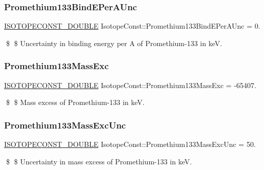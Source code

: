 \subsubsection{\texorpdfstring{Promethium133\+Bind\+E\+Per\+A\+Unc}{Promethium133BindEPerAUnc}}
{\footnotesize\ttfamily \mbox{\hyperlink{group___isotope_const-_macros_ga8f45a7272ce02c0b4c65c44636ed719a}{I\+S\+O\+T\+O\+P\+E\+C\+O\+N\+S\+T\+\_\+\+D\+O\+U\+B\+LE}} Isotope\+Const\+::\+Promethium133\+Bind\+E\+Per\+A\+Unc = 0.}

\$ \$ Uncertainty in binding energy per A of Promethium-\/133 in keV. \mbox{\label{group___isotope_const-_promethium-_pm133_gae45da4b5dc218983ab1d4be84ca98029}} 
\subsubsection{\texorpdfstring{Promethium133\+Mass\+Exc}{Promethium133MassExc}}
{\footnotesize\ttfamily \mbox{\hyperlink{group___isotope_const-_macros_ga8f45a7272ce02c0b4c65c44636ed719a}{I\+S\+O\+T\+O\+P\+E\+C\+O\+N\+S\+T\+\_\+\+D\+O\+U\+B\+LE}} Isotope\+Const\+::\+Promethium133\+Mass\+Exc = -\/65407.}

\$ \$ Mass excess of Promethium-\/133 in keV. \mbox{\label{group___isotope_const-_promethium-_pm133_ga2dcb9eadf4ba74a02163d82fae075a34}} 
\subsubsection{\texorpdfstring{Promethium133\+Mass\+Exc\+Unc}{Promethium133MassExcUnc}}
{\footnotesize\ttfamily \mbox{\hyperlink{group___isotope_const-_macros_ga8f45a7272ce02c0b4c65c44636ed719a}{I\+S\+O\+T\+O\+P\+E\+C\+O\+N\+S\+T\+\_\+\+D\+O\+U\+B\+LE}} Isotope\+Const\+::\+Promethium133\+Mass\+Exc\+Unc = 50.}

\$ \$ Uncertainty in mass excess of Promethium-\/133 in keV. \mbox{\label{group___isotope_const-_promethium-_pm133_ga9bbad3ff51f2ca7984b7c64d29f126a8}} 
